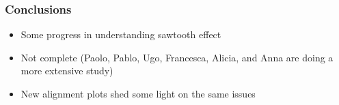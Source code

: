 \documentclass[compress]{beamer}
\begin{document}
\begin{frame}
\frametitle{Conclusions}

\begin{itemize}\setlength{\itemsep}{0.25 cm}
\item Some progress in understanding sawtooth effect
\item Not complete (Paolo, Pablo, Ugo, Francesca, Alicia, and Anna are doing a more extensive study)
\item New alignment plots shed some light on the same issues
\end{itemize}

\label{numpages}
\end{frame}
\end{document}
